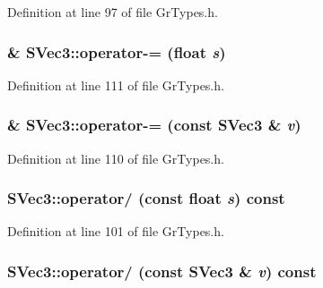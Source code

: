 Definition at line 97 of file GrTypes.h.\hypertarget{struct_s_vec3_eeb11a8159ee71312203d2bab8f7c157}{
\subsubsection[{operator-=}]{\& SVec3::operator-= (float {\em s})}}
\label{struct_s_vec3_eeb11a8159ee71312203d2bab8f7c157}




Definition at line 111 of file GrTypes.h.\hypertarget{struct_s_vec3_3927705cbbdba6a42b8ec8bd839b1528}{
\subsubsection[{operator-=}]{\& SVec3::operator-= (const {\bf SVec3} \& {\em v})}}
\label{struct_s_vec3_3927705cbbdba6a42b8ec8bd839b1528}




Definition at line 110 of file GrTypes.h.\hypertarget{struct_s_vec3_9b3423fe8b3a948e79040e87e830fbf1}{
\subsubsection[{operator/}]{ SVec3::operator/ (const float {\em s}) const}}
\label{struct_s_vec3_9b3423fe8b3a948e79040e87e830fbf1}




Definition at line 101 of file GrTypes.h.\hypertarget{struct_s_vec3_453b45185eca2e60d4e42ccc3be6ad10}{
\subsubsection[{operator/}]{ SVec3::operator/ (const {\bf SVec3} \& {\em v}) const}}
\label{struct_s_vec3_453b45185eca2e60d4e42ccc3be6ad10}




